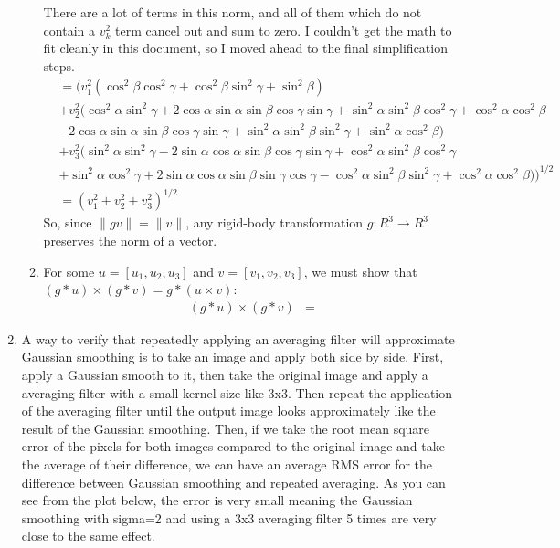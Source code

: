 \documentclass[12pt]{article}
\begin{document}
\begin{enumerate}
\begin{enumerate}
		There are a lot of terms in this norm, and all of them which do not contain a $v_k^2$ term cancel out and sum to zero. I couldn't get the math to fit cleanly in this document, so I moved ahead to the final simplification steps.
		\begin{align*}
		&= \big(v_1^2(\cos^2\beta\cos^2\gamma + \cos^2\beta\sin^2\gamma + \sin^2\beta) \\
		&+ v_2^2 (\cos^2\alpha\sin^2\gamma + 2\cos\alpha\sin\alpha\sin\beta\cos\gamma\sin\gamma + \sin^2\alpha \sin^2\beta\cos^2\gamma + \cos^2\alpha\cos^2\beta \\
		&- 2\cos\alpha\sin\alpha\sin\beta\cos\gamma\sin\gamma + \sin^2\alpha\sin^2\beta\sin^2\gamma + \sin^2\alpha\cos^2\beta) \\
		&+ v_3^2 (\sin^2\alpha\sin^2\gamma - 2\sin\alpha\cos\alpha\sin\beta\cos\gamma\sin\gamma + \cos^2\alpha\sin^2\beta\cos^2\gamma \\ &+ \sin^2\alpha\cos^2\gamma + 2 \sin\alpha\cos\alpha\sin\beta\sin\gamma\cos\gamma - \cos^2\alpha\sin^2\beta\sin^2\gamma + \cos^2\alpha\cos^2\beta) \big)^{1/2} \\
		&= (v_1^2 + v_2^2 + v_3^2)^{1/2} 
		\end{align*}
		So, since $\|gv\| = \|v\|$, any rigid-body transformation $g: R^3 \rightarrow R^3$ preserves the norm of a vector.
		\item For some  $u = [u_1, u_2, u_3]$ and $v = [v_1, v_2, v_3]$, we must show that $(g * u) \times (g * v) = g * (u \times v)$:
		\begin{align*}
		(g * u) \times (g * v) &=
		\end{align*}
	\end{enumerate}
	\item A way to verify that repeatedly applying an averaging filter will approximate Gaussian smoothing is to take an image and apply both side by side. First, apply a Gaussian smooth to it, then take the original image and apply a averaging filter with a small kernel size like 3x3. Then repeat the application of the averaging filter until the output image looks approximately like the result of the Gaussian smoothing. Then, if we take the root mean square error of the pixels for both images compared to the original image and take the average of their difference, we can have an average RMS error for the difference between Gaussian smoothing and repeated averaging. As you can see from the plot below, the error is very small meaning the Gaussian smoothing with sigma=2 and using a 3x3 averaging filter 5 times are very close to the same effect. \\

\end{enumerate}
\end{document}
